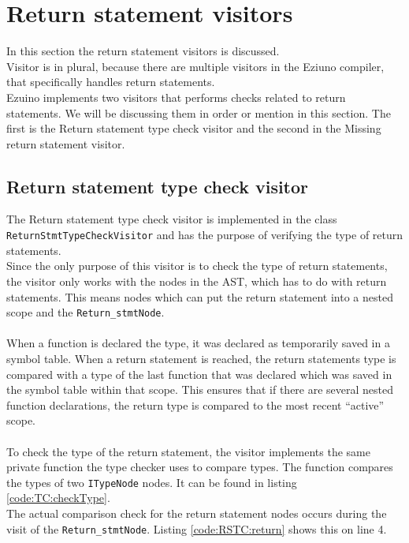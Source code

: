 \section{Return statement visitors}
In this section the return statement visitors is discussed.\\
Visitor is in plural, because there are multiple visitors in the Eziuno compiler, that specifically handles return statements.\\
Ezuino implements two visitors that performs checks related to return statements. We will be discussing them in order or mention in this section. The first is the Return statement type check visitor and the second in the Missing return statement visitor.

\subsection{Return statement type check visitor}
The Return statement type check visitor is implemented in the class \texttt{ReturnStmtTypeCheckVisitor} and has the purpose of verifying the type of return statements.\\
Since the only purpose of this visitor is to check the type of return statements, the visitor only works with the nodes in the AST, which has to do with return statements. This means nodes which can put the return statement into a nested scope and the \texttt{Return\_stmtNode}.
\\\\
When a function is declared the type, it was declared as temporarily saved in a symbol table. When a return statement is reached, the return statements type is compared with a type of the last function that was declared which was saved in the symbol table within that scope. This ensures that if there are several nested function declarations, the return type is compared to the most recent “active” scope.
\\\\
To check the type of the return statement, the visitor implements the same private function the type checker uses to compare types. The function compares the types of two \texttt{ITypeNode} nodes. It can be found in listing \ref{code:TC:checkType}.\\
The actual comparison check for the return statement nodes occurs during the visit of the \texttt{Return\_stmtNode}. Listing \ref{code:RSTC:return} shows this on line 4.

\noindent

